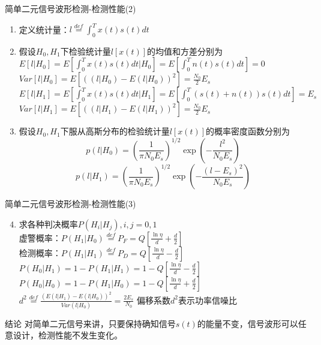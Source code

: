 \begin{frame}{简单二元信号波形检测-检测性能(2)}
\begin{enumerate}[1]
	\item 定义统计量：$l\mathop{=}\limits^{def}\int_{0}^{T}x(t)s(t)dt$
	\item 假设$H_0,H_1$下检验统计量$l[x(t)]$的均值和方差分别为\\
	$E[l|H_0]=E\left[\int_{0}^{T}x(t)s(t)dt|H_0\right]=E\left[\int_{0}^{T}n(t)s(t)dt\right]=0$\\ 
	$Var[l|H_0]=E[((l|H_0)-E(l|H_0))^2]=\frac{N_0}{2}E_s$\\
	$E[l|H_1]=E\left[\int_{0}^{T}x(t)s(t)dt|H_1\right]=E\left[\int_{0}^{T}(s(t)+n(t))s(t)dt\right]=E_s$\\
	$Var[l|H_1]=E[((l|H_1)-E(l|H_1))^2]=\frac{N_0}{2}E_s$\\
	\item 假设$H_0,H_1$下服从高斯分布的检验统计量$l[x(t)]$的概率密度函数分别为\\
\[p(l|H_0)=\left(\frac{1}{\pi N_0E_s}\right)^{1/2}\exp\left(-\frac{l^2}{N_0E_s}\right)\]
	\[p(l|H_1)=\left(\frac{1}{\pi N_0E_s}\right)^{1/2}\exp\left(-\frac{(l-E_s)^2}{N_0E_s}\right)\]
\end{enumerate}
\end{frame}
\begin{frame}{简单二元信号波形检测-检测性能(3)}
\begin{enumerate}
	\setcounter{enumi}{3} 
	\item 求各种判决概率$P(H_i|H_j),i,j=0,1$\\
	虚警概率：$P(H_1|H_0)\mathop{=}\limits^{def}P_F=Q\left[\frac{\ln\eta}{d}+\frac{d}{2}\right]$\\ 检测概率：$P(H_1|H_1)\mathop{=}\limits^{def}P_D=Q\left[\frac{\ln\eta}{d}-\frac{d}{2}\right]$\\
	$P(H_0|H_1)=1-P(H_1|H_1)=1-Q\left[\frac{\ln\eta}{d}-\frac{d}{2}\right]$\\
	$P(H_0|H_0)=1-P(H_1|H_0)=1-Q\left[\frac{\ln\eta}{d}+\frac{d}{2}\right]$\\
	$d^2\mathop{=}\limits^{def}\frac{(E(l|H_1)-E(l|H_0))^2}{Var(l|H_0)}=\frac{2E_s}{N_0}$ \qquad 偏移系数$d^2$表示功率信噪比\\
\end{enumerate}
\begin{block}{结论}
	对简单二元信号来讲，只要保持确知信号$s(t)$的能量不变，信号波形可以任意设计，检测性能不发生变化。
\end{block}
\end{frame}

